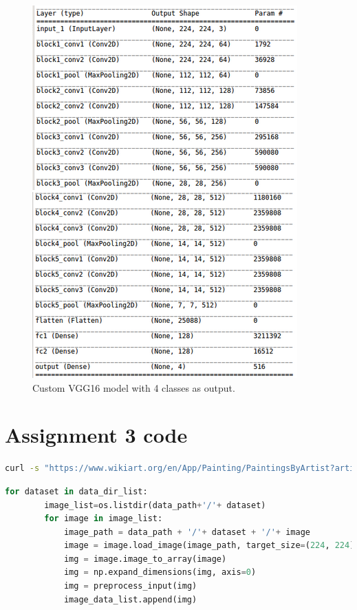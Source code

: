 
\begin{figure}[H]
    \centering
    \includegraphics[scale=0.7]{Graphics/Assignment3/custom_model_image.png}
    \caption{Custom VGG16 model with 4 classes as output.}
    \label{fig:custom_vgg16}
\end{figure}

\section{Assignment 3 code}

\begin{lstlisting}[frame=single, language=Bash, label={code:fetch_images}, caption={Code to fetch images from Wikiart for specific artists, in this case Manet.}]
    curl -s "https://www.wikiart.org/en/App/Painting/PaintingsByArtist?artistUrl=edouard-manet&json=2" | jq -r 'map(.image) | join("\n")' | sed '' | xargs -P 10 -n 1 curl -s -O
\end{lstlisting}

\begin{lstlisting}[frame=single, language=Python, label={code:load_data}, caption={Code to load data for preprocessing.}]
    for dataset in data_dir_list:
	    image_list=os.listdir(data_path+'/'+ dataset)
    	for image in image_list:
    		image_path = data_path + '/'+ dataset + '/'+ image 
    		image = image.load_image(image_path, target_size=(224, 224))
    		img = image.image_to_array(image)
    		img = np.expand_dimensions(img, axis=0)
    		img = preprocess_input(img)
    		image_data_list.append(img)
\end{lstlisting}


